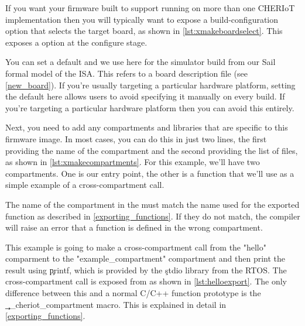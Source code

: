 If you want your firmware built to support running on more than one CHERIoT implementation then you will typically want to expose a build-configuration option that selects the target board, as shown in \ref{lst:xmakeboardselect}.
This exposes a  option at the configure stage.

\lualisting[filename=examples/hello_world/xmake.lua,marker=board,label=lst:xmakeboardselect,caption="Build system code for allowing the board to be selected at configure time"]{}

You can set a default and we use  here for the simulator build from our Sail formal model of the ISA.
This refers to a board description file (see \ref{new_board}).
If you're usually targeting a particular hardware platform, setting the default here allows users to avoid specifying it manually on every build.
If you're  targeting a particular hardware platform then you can avoid this entirely.

Next, you need to add any compartments and libraries that are specific to this firmware image.
In most cases, you can do this in just two lines, the first providing the name of the compartment and the second providing the list of files, as shown in \ref{lst:xmakecompartments}.
For this example, we'll have two compartments.
One is our entry point, the other is a function that we'll use as a simple example of a cross-compartment call.

\lualisting[filename=examples/hello_world/xmake.lua,marker=compartments,label=lst:xmakecompartments,caption="Build system code for building compartments"]{}

\begin{caution}
	The name of the compartment in the  must match the name used for the exported function as described in \ref{exporting_functions}.
	If they do not match, the compiler will raise an error that a function is defined in the wrong compartment.
\end{caution}

This example is going to make a cross-compartment call from the "hello" comparment to the "example_compartment" compartment and then print the result using \c{printf}, which is provided by the \c{stdio} library from the RTOS.
The cross-compartment call is exposed from  as shown in \ref{lst:helloexport}.
The only difference between this and a normal C/C++ function prototype is the \c{__cheriot_compartment} macro.
This is explained in detail in \ref{exporting_functions}.


